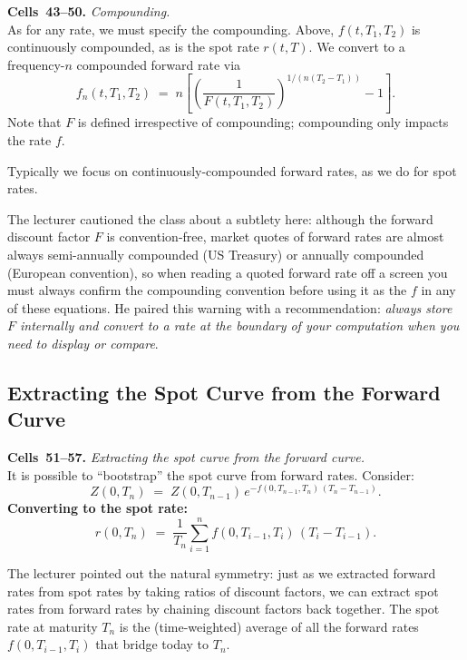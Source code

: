 \begin{keyblock}
\textbf{Cells~43--50.} \emph{Compounding.}\\
As for any rate, we must specify the compounding. Above, $f(t,T_1,T_2)$ is
continuously compounded, as is the spot rate $r(t,T)$. We convert to a
frequency-$n$ compounded forward rate via
\[
    f_n(t,T_1,T_2) \;=\; n\!\left[\!\left(\frac{1}{F(t,T_1,T_2)}\right)^{1/(n(T_2-T_1))} - 1\right].
\]
Note that $F$ is defined irrespective of compounding; compounding only
impacts the rate $f$.

Typically we focus on continuously-compounded forward rates, as we do for
spot rates.
\end{keyblock}

The lecturer cautioned the class about a subtlety here: although the forward
discount factor $F$ is convention-free, market quotes of forward rates are
almost always semi-annually compounded (US Treasury) or annually compounded
(European convention), so when reading a quoted forward rate off a screen
you must always confirm the compounding convention before using it as the
$f$ in any of these equations. He paired this warning with a recommendation:
\emph{always store $F$ internally and convert to a rate at the boundary of
your computation when you need to display or compare}.

\subsection{Extracting the Spot Curve from the Forward Curve}\label{L1-sec:fwd-spot}

\begin{keyblock}
\textbf{Cells~51--57.} \emph{Extracting the spot curve from the forward curve.}\\
It is possible to ``bootstrap'' the spot curve from forward rates. Consider:
\[
    Z(0,T_n) \;=\; Z(0,T_{n-1})\, e^{-f(0,T_{n-1},T_n)\,(T_n - T_{n-1})}.
\]
\textbf{Converting to the spot rate:}
\[
    r(0,T_n) \;=\; \frac{1}{T_n}\sum_{i=1}^{n} f(0,T_{i-1},T_i)\,(T_i - T_{i-1}).
\]
\end{keyblock}

The lecturer pointed out the natural symmetry: just as we extracted forward
rates from spot rates by taking ratios of discount factors, we can extract
spot rates from forward rates by chaining discount factors back together.
The spot rate at maturity $T_n$ is the (time-weighted) average of all the
forward rates $f(0,T_{i-1},T_i)$ that bridge today to $T_n$.

